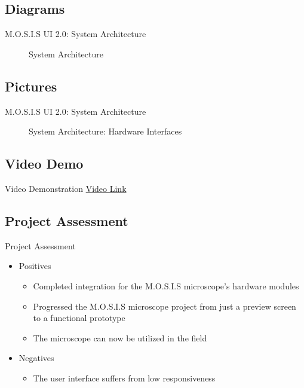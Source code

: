 \documentclass[17pt, aspectratio=169]{beamer}
\begin{document}
\subsection*{Diagrams}
\begin{frame}{M.O.S.I.S UI 2.0: System Architecture}
	\begin{figure}
		\caption{System Architecture}
	\end{figure}
\end{frame}
\subsection*{Pictures}
\begin{frame}{M.O.S.I.S UI 2.0: System Architecture}
	\begin{figure}
		\caption{System Architecture: Hardware Interfaces}
	\end{figure}

\end{frame}
\subsection{Video Demo}
\begin{frame}{Video Demonstration}
	\href{https://youtu.be/JZFvu8QhQfI}{Video Link}
\end{frame}
\subsection{Project Assessment}
\begin{frame}{Project Assessment}
	\begin{itemize}
		\item Positives
		      \begin{itemize}
			      \item Completed integration for the M.O.S.I.S microscope's hardware modules
			      \item Progressed the M.O.S.I.S microscope project from just a preview screen to a functional prototype
			      \item The microscope can now be utilized in the field
		      \end{itemize}
		\item Negatives
		      \begin{itemize}
			      \item The user interface suffers from low responsiveness
		      \end{itemize}
	\end{itemize}
\end{frame}
\end{document}
